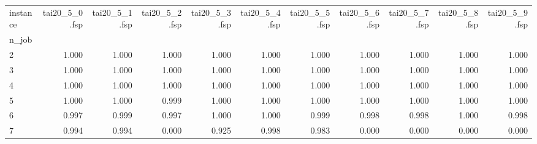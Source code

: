 \begin{tabular}{lrrrrrrrrrr}
\toprule
instance & tai20_5_0.fsp & tai20_5_1.fsp & tai20_5_2.fsp & tai20_5_3.fsp & tai20_5_4.fsp & tai20_5_5.fsp & tai20_5_6.fsp & tai20_5_7.fsp & tai20_5_8.fsp & tai20_5_9.fsp \\
n_job &  &  &  &  &  &  &  &  &  &  \\
\midrule
2 & 1.000 & 1.000 & 1.000 & 1.000 & 1.000 & 1.000 & 1.000 & 1.000 & 1.000 & 1.000 \\
3 & 1.000 & 1.000 & 1.000 & 1.000 & 1.000 & 1.000 & 1.000 & 1.000 & 1.000 & 1.000 \\
4 & 1.000 & 1.000 & 1.000 & 1.000 & 1.000 & 1.000 & 1.000 & 1.000 & 1.000 & 1.000 \\
5 & 1.000 & 1.000 & 0.999 & 1.000 & 1.000 & 1.000 & 1.000 & 1.000 & 1.000 & 1.000 \\
6 & 0.997 & 0.999 & 0.997 & 1.000 & 1.000 & 0.999 & 0.998 & 0.998 & 1.000 & 0.998 \\
7 & 0.994 & 0.994 & 0.000 & 0.925 & 0.998 & 0.983 & 0.000 & 0.000 & 0.000 & 0.000 \\
\bottomrule
\end{tabular}
